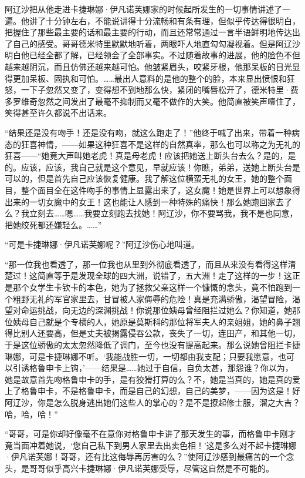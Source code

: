 \par 阿辽沙把从他走进卡捷琳娜·伊凡诺芙娜家的时候起所发生的一切事情讲述了一遍。他讲了十分钟左右，不能说讲得十分流畅和有条有理，但似乎传达得很明白，把握住了那些最主要的话和最主要的行动，而且还常常通过一言半语鲜明地传达出了自己的感受。哥哥德米特里默默地听着，两眼吓人地直勾勾凝视着。但是阿辽沙明白他已经全都了解，已经领会了全部事实。不过随着故事的进展，他的脸色不但越来越阴沉，而且仿佛还越来越可怕。他皱紧眉头，咬紧牙根，他那呆板的目光显得更加呆板、固执和可怕。……最出人意料的是他的整个的脸，本来显出愤恨和狂怒，一下子忽然又变了，变得想不到地那么快，紧闭的嘴唇松开了，德米特里·费多罗维奇忽然之间发出了最毫不抑制而又毫不做作的大笑。他简直被笑声噎住了，笑得甚至许久都说不出话来。
\par “结果还是没有吻手！还是没有吻，就这么跑走了！”他终于喊了出来，带着一种病态的狂喜神情，——如果这种狂喜不是这样的自然真率，那么也可以称之为无礼的狂喜——“她竟大声叫她老虎！真是母老虎！应该把她送上断头台去么？是的，是的。应该，应该，我自己就是这个意见，早就应该！你瞧，弟弟，送她上断头台是可以的，但是首先自己应该恢复健康。我了解这位横蛮无礼的女王，她的整个面目，整个面目全在这件吻手的事情上显露出来了，这女魔！她是世界上可以想象得出来的一切女魔中的女王！这也能让人感到一种特殊的痛快！那么她跑回家去了么？我立刻去……嗯……我要立刻跑去找她！阿辽沙，你不要骂我，我不是也同意，把她绞死都还嫌轻么。……”
\par “可是卡捷琳娜·伊凡诺芙娜呢？”阿辽沙伤心地叫道。
\par “那一位我也看透了，那一位我也从里到外彻底看透了，而且从来没有看得这样清楚过！这简直等于是发现全球的四大洲，说错了，五大洲！走了这样的一步！这正是那个女学生卡钦卡的本色，她为了拯救父亲这样一个慷慨的念头，竟不怕跑到一个粗野无礼的军官家里去，甘冒被人家侮辱的危险！真是充满骄傲，渴望冒险，渴望对命运挑战，向无边的深渊挑战！你说那位姨母曾经阻拦过她么？你知道，她那位姨母自己就是个专横的人，她原是莫斯科的那位将军夫人的亲姐姐，她的鼻子翘得比别人还要高，但是丈夫被揭露侵吞公款，丧失了一切，连田产，和其他一切，于是这位骄傲的太太忽然降低了调门，至今也没有提高起来。那么说她曾阻拦卡捷琳娜，可是卡捷琳娜不听。‘我能战胜一切，一切都由我支配；只要我愿意，也可以引诱格鲁申卡上钩，’——结果是……她过于自信，自负太甚，那怨谁？你以为，她是故意首先吻格鲁申卡的手，是有狡猾打算的么？不，她是当真的，她是真的爱上了格鲁申卡，不是格鲁申卡，而是自己的幻想，自己的美梦，——因为这是！好阿辽沙，你是怎么脱身逃出她们这些人的掌心的？是不是撩起修士服，溜之大吉？哈，哈，哈！”
\par “哥哥，可是你却好像毫不在意你对格鲁申卡讲了那天发生的事，而格鲁申卡刚才竟当面冲着她说，‘您自己私下到男人家里去出卖色相！’这是多么对不起卡捷琳娜·伊凡诺芙娜！哥哥，还有比这侮辱再厉害的么？”使阿辽沙感到最痛苦的一个念头，是哥哥似乎高兴卡捷琳娜·伊凡诺芙娜受辱，尽管这自然是不可能的。
